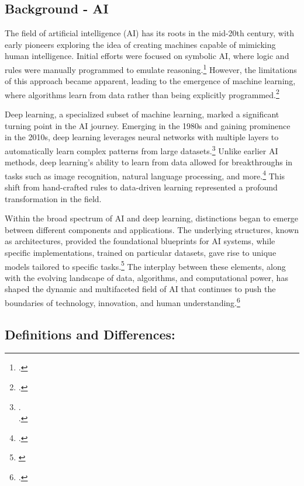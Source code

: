 \documentclass{article}[10pt]
\begin{document}
\subsection{Background - AI}

The field of artificial intelligence (AI) has its roots in the mid-20th century, with early pioneers exploring the idea of creating machines capable of mimicking human intelligence. Initial efforts were focused on symbolic AI, where logic and rules were manually programmed to emulate reasoning.\footnote{
    \cite{russell2010artificial}.}
However, the limitations of this approach became apparent, leading to the emergence of machine learning, where algorithms learn from data rather than being explicitly programmed.\footnote{
    \cite{mccorduck2004machines}.}\par

Deep learning, a specialized subset of machine learning, marked a significant turning point in the AI journey. 
Emerging in the 1980s and gaining prominence in the 2010s, deep learning leverages neural networks with multiple layers to automatically learn complex patterns from large datasets.\footnote{
    \cite{lecun2015deep}.\\
    \indent\indent \cite{goodfellow2016deep}.}
Unlike earlier AI methods, deep learning's ability to learn from data allowed for breakthroughs in tasks such as image recognition, natural language processing, and more.\footnote{
    \cite{krizhevsky2012imagenet}.}
This shift from hand-crafted rules to data-driven learning represented a profound transformation in the field.\par

Within the broad spectrum of AI and deep learning, distinctions began to emerge between different components and applications. The underlying structures, known as architectures, provided the foundational blueprints for AI systems, while specific implementations, trained on particular datasets, gave rise to unique models tailored to specific tasks.\footnote{
    \cite{goodfellow2016deep}}
The interplay between these elements, along with the evolving landscape of data, algorithms, and computational power, has shaped the dynamic and multifaceted field of AI that continues to push the boundaries of technology, innovation, and human understanding.\footnote{
    \cite{jordan2015machine}.}

\subsection{Definitions and Differences:}
\end{document}

